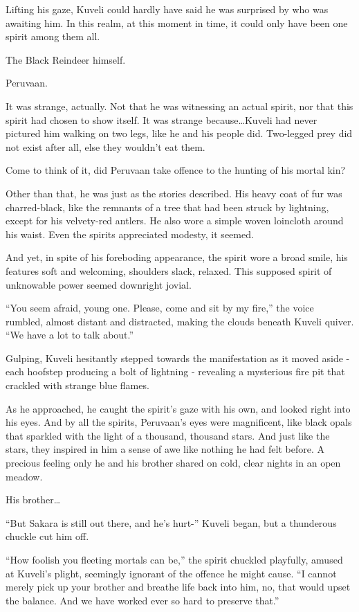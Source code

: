 Lifting his gaze, Kuveli could hardly have said he was surprised by who was awaiting him. In this realm, at this moment in time, it could only have been one spirit among them all.

The Black Reindeer himself.

Peruvaan.

It was strange, actually. Not that he was witnessing an actual spirit, nor that this spirit had chosen to show itself. It was strange because\ldots{}Kuveli had never pictured him walking on two legs, like he and his people did. Two-legged prey did not exist after all, else they wouldn't eat them.

Come to think of it, did Peruvaan take offence to the hunting of his mortal kin?

Other than that, he was just as the stories described. His heavy coat of fur was charred-black, like the remnants of a tree that had been struck by lightning, except for his velvety-red antlers. He also wore a simple woven loincloth around his waist. Even the spirits appreciated modesty, it seemed.

And yet, in spite of his foreboding appearance, the spirit wore a broad smile, his features soft and welcoming, shoulders slack, relaxed. This supposed spirit of unknowable power seemed downright jovial.

``You seem afraid, young one. Please, come and sit by my fire,'' the voice rumbled, almost distant and distracted, making the clouds beneath Kuveli quiver. ``We have a lot to talk about.''

Gulping, Kuveli hesitantly stepped towards the manifestation as it moved aside - each hoofstep producing a bolt of lightning - revealing a mysterious fire pit that crackled with strange blue flames.

As he approached, he caught the spirit's gaze with his own, and looked right into his eyes. And by all the spirits, Peruvaan's eyes were magnificent, like black opals that sparkled with the light of a thousand, thousand stars. And just like the stars, they inspired in him a sense of awe like nothing he had felt before. A precious feeling only he and his brother shared on cold, clear nights in an open meadow.

His brother\ldots{}

``But Sakara is still out there, and he's hurt-'' Kuveli began, but a thunderous chuckle cut him off.

``How foolish you fleeting mortals can be,'' the spirit chuckled playfully, amused at Kuveli's plight, seemingly ignorant of the offence he might cause. ``I cannot merely pick up your brother and breathe life back into him, no, that would upset the balance. And we have worked ever so hard to preserve that.''

